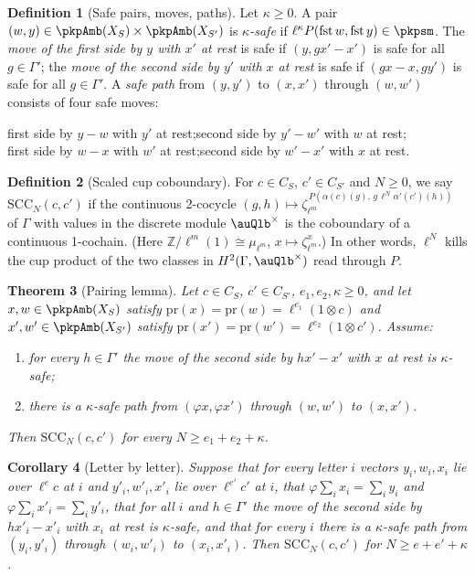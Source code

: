 \documentclass[10pt]{amsart}
\newtheorem{theorem}{Theorem}[section]
\newtheorem{corollary}[theorem]{Corollary}
\theoremstyle{definition}
\newtheorem{definition}[theorem]{Definition}
\theoremstyle{remark}
\newcommand{\Z}{\mathbb Z}
\begin{document}
\begin{definition}[Safe pairs, moves, paths]\label{pkp:def-safe}
Let $\kappa\ge0$. A pair $(w,y)\in\pkpAmb(X_S)\times\pkpAmb(X_{S'})$ is \emph{$\kappa$-safe} if
$\ell^\kappa P(\mathrm{fst}\,w,\mathrm{fst}\,y)\in\pkpsm$. The \emph{move of the first side by $y$
with $x'$ at rest} is safe if $(y,gx'-x')$ is safe for all $g\in\Gamma'$; the \emph{move of the second
side by $y'$ with $x$ at rest} is safe if $(gx-x,gy')$ is safe for all $g\in\Gamma'$. A \emph{safe
path} from $(y,y')$ to $(x,x')$ through $(w,w')$ consists of four safe moves:
\begin{center}
first side by $y-w$ with $y'$ at rest;\quad second side by $y'-w'$ with $w$ at rest;\\
first side by $w-x$ with $w'$ at rest;\quad second side by $w'-x'$ with $x$ at rest.
\end{center}
\end{definition}

\begin{definition}[Scaled cup coboundary]\label{pkp:def-scc}
For $c\in C_S$, $c'\in C_{S'}$ and $N\ge0$, we say $\mathrm{SCC}_N(c,c')$ if the continuous 2-cocycle
$(g,h)\mapsto\zeta_{\ell^m}^{\,P(\alpha(c)(g),\,g\,\ell^N\alpha'(c')(h))}$ of $\Gamma$ with values in
the discrete module $\auQlb^{\times}$ is the coboundary of a continuous 1-cochain. (Here
$\Z/\ell^m(1)\cong\mu_{\ell^m}$, $x\mapsto\zeta_{\ell^m}^x$.) In other words, $\ell^N$ kills the cup
product of the two classes in $H^2(\Gamma,\auQlb^\times)$ read through $P$.
\end{definition}

\begin{theorem}[Pairing lemma]\label{pkp:pairing}
Let $c\in C_S$, $c'\in C_{S'}$, $e_1,e_2,\kappa\ge0$, and let $x,w\in\pkpAmb(X_S)$ satisfy
$\mathrm{pr}(x)=\mathrm{pr}(w)=\ell^{e_1}(1\otimes c)$ and $x',w'\in\pkpAmb(X_{S'})$ satisfy
$\mathrm{pr}(x')=\mathrm{pr}(w')=\ell^{e_2}(1\otimes c')$. Assume:
\begin{enumerate}
\item[(a)] for every $h\in\Gamma'$ the move of the second side by $hx'-x'$ with $x$ at rest is
$\kappa$-safe;
\item[(b)] there is a $\kappa$-safe path from $(\varphi x,\varphi x')$ through $(w,w')$ to $(x,x')$.
\end{enumerate}
Then $\mathrm{SCC}_N(c,c')$ for every $N\ge e_1+e_2+\kappa$.
\end{theorem}

\begin{corollary}[Letter by letter]\label{pkp:letters}
Suppose that for every letter $i$ vectors $y_i,w_i,x_i$ lie over $\ell^ec$ at $i$ and
$y'_i,w'_i,x'_i$ lie over $\ell^{e'}c'$ at $i$, that $\varphi\sum_ix_i=\sum_iy_i$ and
$\varphi\sum_ix'_i=\sum_iy'_i$, that for all $i$ and $h\in\Gamma'$ the move of the second side by
$hx'_i-x'_i$ with $x_i$ at rest is $\kappa$-safe, and that for every $i$ there is a $\kappa$-safe path
from $(y_i,y'_i)$ through $(w_i,w'_i)$ to $(x_i,x'_i)$. Then $\mathrm{SCC}_N(c,c')$ for $N\ge
e+e'+\kappa$.
\end{corollary}
\end{document}
